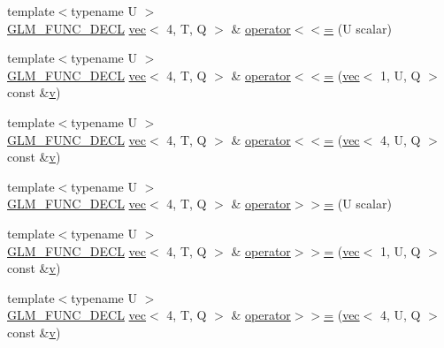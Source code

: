 \begin{DoxyCompactItemize}
\item 
{\footnotesize template$<$typename U $>$ }\\\mbox{\hyperlink{setup_8hpp_ab2d052de21a70539923e9bcbf6e83a51}{G\+L\+M\+\_\+\+F\+U\+N\+C\+\_\+\+D\+E\+CL}} \mbox{\hyperlink{structglm_1_1vec}{vec}}$<$ 4, T, Q $>$ \& \mbox{\hyperlink{structglm_1_1vec_3_014_00_01_t_00_01_q_01_4_a4520239c55fdd62342d10feb560a0371}{operator$<$$<$=}} (U scalar)
\item 
{\footnotesize template$<$typename U $>$ }\\\mbox{\hyperlink{setup_8hpp_ab2d052de21a70539923e9bcbf6e83a51}{G\+L\+M\+\_\+\+F\+U\+N\+C\+\_\+\+D\+E\+CL}} \mbox{\hyperlink{structglm_1_1vec}{vec}}$<$ 4, T, Q $>$ \& \mbox{\hyperlink{structglm_1_1vec_3_014_00_01_t_00_01_q_01_4_a2bebbff20e52b3c0ceaab741bbaefec8}{operator$<$$<$=}} (\mbox{\hyperlink{structglm_1_1vec}{vec}}$<$ 1, U, Q $>$ const \&\mbox{\hyperlink{_s_d_l__opengl_8h_a10a82eabcb59d2fcd74acee063775f90}{v}})
\item 
{\footnotesize template$<$typename U $>$ }\\\mbox{\hyperlink{setup_8hpp_ab2d052de21a70539923e9bcbf6e83a51}{G\+L\+M\+\_\+\+F\+U\+N\+C\+\_\+\+D\+E\+CL}} \mbox{\hyperlink{structglm_1_1vec}{vec}}$<$ 4, T, Q $>$ \& \mbox{\hyperlink{structglm_1_1vec_3_014_00_01_t_00_01_q_01_4_aee9c69807b9f783f5b6801f86fe153d7}{operator$<$$<$=}} (\mbox{\hyperlink{structglm_1_1vec}{vec}}$<$ 4, U, Q $>$ const \&\mbox{\hyperlink{_s_d_l__opengl_8h_a10a82eabcb59d2fcd74acee063775f90}{v}})
\item 
{\footnotesize template$<$typename U $>$ }\\\mbox{\hyperlink{setup_8hpp_ab2d052de21a70539923e9bcbf6e83a51}{G\+L\+M\+\_\+\+F\+U\+N\+C\+\_\+\+D\+E\+CL}} \mbox{\hyperlink{structglm_1_1vec}{vec}}$<$ 4, T, Q $>$ \& \mbox{\hyperlink{structglm_1_1vec_3_014_00_01_t_00_01_q_01_4_a28cea4bef361cb5dd994a3912fb1e00e}{operator$>$$>$=}} (U scalar)
\item 
{\footnotesize template$<$typename U $>$ }\\\mbox{\hyperlink{setup_8hpp_ab2d052de21a70539923e9bcbf6e83a51}{G\+L\+M\+\_\+\+F\+U\+N\+C\+\_\+\+D\+E\+CL}} \mbox{\hyperlink{structglm_1_1vec}{vec}}$<$ 4, T, Q $>$ \& \mbox{\hyperlink{structglm_1_1vec_3_014_00_01_t_00_01_q_01_4_ab04515a0b171b86148f9cf04edfde65f}{operator$>$$>$=}} (\mbox{\hyperlink{structglm_1_1vec}{vec}}$<$ 1, U, Q $>$ const \&\mbox{\hyperlink{_s_d_l__opengl_8h_a10a82eabcb59d2fcd74acee063775f90}{v}})
\item 
{\footnotesize template$<$typename U $>$ }\\\mbox{\hyperlink{setup_8hpp_ab2d052de21a70539923e9bcbf6e83a51}{G\+L\+M\+\_\+\+F\+U\+N\+C\+\_\+\+D\+E\+CL}} \mbox{\hyperlink{structglm_1_1vec}{vec}}$<$ 4, T, Q $>$ \& \mbox{\hyperlink{structglm_1_1vec_3_014_00_01_t_00_01_q_01_4_af1c26b9e068a4ea0fdd6dbb554d27100}{operator$>$$>$=}} (\mbox{\hyperlink{structglm_1_1vec}{vec}}$<$ 4, U, Q $>$ const \&\mbox{\hyperlink{_s_d_l__opengl_8h_a10a82eabcb59d2fcd74acee063775f90}{v}})

\end{DoxyCompactItemize}
